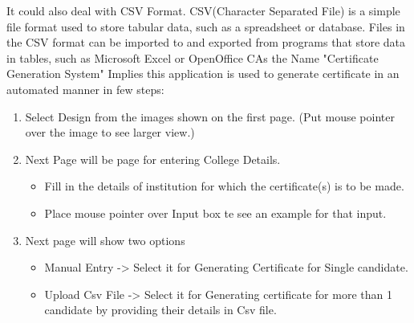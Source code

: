 \begin{Large}
\end{Large}
It could also deal with CSV Format. CSV(Character Separated File) is a simple file format used to store tabular data, such as a
spreadsheet or database. Files in the CSV format can be imported to and exported from programs
that store data in tables, such as Microsoft Excel or OpenOffice CAs the Name "Certificate Generation System" Implies this application is used to 
generate certificate in an automated manner in few steps: 
\begin{enumerate}
\item Select Design from the images shown on the first page.
   (Put mouse pointer over the image to see larger view.)
\item Next Page will be page for entering College Details.
\begin{itemize}
\item Fill in the details of institution for which the certificate(s) is to be made.
\item Place mouse pointer over Input box te see an example for that input.
\end{itemize}
\item Next page will show two options
\begin{itemize}
\item Manual Entry    -> Select it for Generating Certificate for Single candidate.
\item Upload Csv File -> Select it for Generating certificate for more than 1 candidate by providing their details in Csv file.
\end{itemize}
\end{enumerate}

